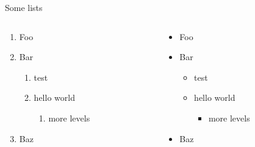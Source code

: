 \documentclass[pdf]{beamer}
\begin{document}
\begin{frame}{\insertsectionhead}{Some lists}
	\begin{columns}
		\begin{column}{0.5\textwidth}
			\begin{enumerate}
				\item Foo
				\item Bar
				\begin{enumerate}
					\item test
					\item hello world
					\begin{enumerate}
						\item more levels
					\end{enumerate}
				\end{enumerate}
				\item Baz
			\end{enumerate}
		\end{column}
		\begin{column}{0.5\textwidth}
			\begin{itemize}
				\item Foo
				\item Bar
				\begin{itemize}
					\item test
					\item hello world
					\begin{itemize}
						\item more levels
					\end{itemize}
				\end{itemize}
				\item Baz
			\end{itemize}
		\end{column}
	\end{columns}
\end{frame}
\end{document}
